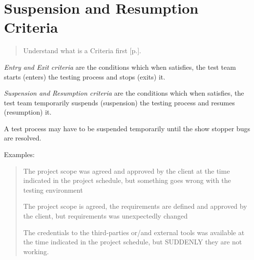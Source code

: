 \section{Suspension and Resumption Criteria}
\label{sec:Suspension and Resumption Criteria}
\begin{quote}
Understand what is a Criteria first [p.\pageref{sec:Criteria}].
\end{quote} 

\emph{Entry and Exit criteria} are the conditions which when satisfies, the test team starts (enters) the testing process and stops (exits) it.

\emph{Suspension and Resumption criteria} are the conditions which when satisfies, the test team temporarily suspends (suspension) the testing process and resumes (resumption) it.

A test process may have to be suspended temporarily until the show stopper bugs are resolved.

Examples:

    \begin{quote}
The project scope was agreed and approved by the client at the time indicated in the project schedule, but something goes wrong with the testing environment

    The project scope is agreed, the requirements are defined and approved by the client, but requirements was unexpectedly changed                                                                                                                                   

The credentials to the third-parties or/and external tools was available at the time indicated in the project schedule, but SUDDENLY they are not working.\end{quote} 